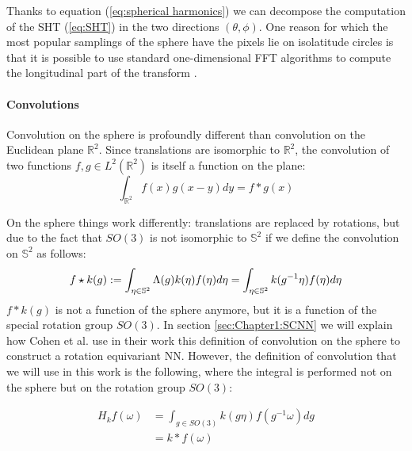 Thanks to equation (\ref{eq:spherical harmonics}) we can decompose the computation of the SHT (\ref{eq:SHT}) in the two directions $(\theta, \phi)$. One reason for which the most popular samplings of the sphere have the pixels lie on isolatitude circles is that it is possible to use standard one-dimensional FFT algorithms to compute the longitudinal part of the transform \cite{HEALPix}.

\paragraph{Convolutions}
Convolution on the sphere is profoundly different than convolution on the Euclidean plane $\mathbb R^2$. Since translations are isomorphic to $\mathbb R^2$, the convolution of two functions $f, g \in L^2(\mathbb R^2)$ is itself a function on the plane:
$$ \int_{\mathbb R^2} f(x)g(x-y)dy = f*g(x)$$

On the sphere things work differently: translations are replaced by rotations, but due to the fact that $SO(3)$ is not isomorphic to $\mathbb S^2$ if we define the convolution on $\mathbb S^2$ as follows:
\begin{equation} \label{eq:cohen convolution}
f\star k(g) := \int_{\eta \in \mathbb S^2} \Lambda(g)k( \eta) f(\eta) d\eta=\int_{\eta \in \mathbb S^2} k(g^{-1} \eta) f(\eta) d\eta\\ 
\end{equation}
$f*k(g)$ is not a function of the sphere anymore, but it is a function of the special rotation group $SO(3)$. In section \ref{sec:Chapter1:SCNN} we will explain how Cohen et al. \cite{SCNN} use in their work this definition of convolution on the sphere to construct a rotation equivariant NN. However, the definition of convolution that we will use in this work is the following, where the integral is performed not on the sphere but on the rotation group $SO(3)$:

\begin{equation}\label{eq:convolution}
	\begin{aligned} H_{k} f(\omega) &=\int_{g \in S O(3)} k(g \eta) f\left(g^{-1} \omega\right) d g \\ &=k * f(\omega) \end{aligned}
\end{equation}

